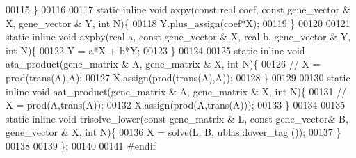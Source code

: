 \begin{DoxyCode}
00115   \}
00116 
00117   \textcolor{keyword}{static} \textcolor{keyword}{inline} \textcolor{keywordtype}{void} axpy(\textcolor{keyword}{const} real coef, \textcolor{keyword}{const} gene\_vector & X, gene\_vector & Y, \textcolor{keywordtype}{int} N)\{
00118     Y.plus\_assign(coef*X);
00119   \}
00120 
00121   \textcolor{keyword}{static} \textcolor{keyword}{inline} \textcolor{keywordtype}{void} axpby(real a, \textcolor{keyword}{const} gene\_vector & X, real b, gene\_vector & Y, \textcolor{keywordtype}{int} N)\{
00122     Y = a*X + b*Y;
00123   \}
00124 
00125   \textcolor{keyword}{static} \textcolor{keyword}{inline} \textcolor{keywordtype}{void} ata\_product(gene\_matrix & A, gene\_matrix & X, \textcolor{keywordtype}{int} N)\{
00126     \textcolor{comment}{// X =  prod(trans(A),A);}
00127     X.assign(prod(trans(A),A));
00128   \}
00129 
00130   \textcolor{keyword}{static} \textcolor{keyword}{inline} \textcolor{keywordtype}{void} aat\_product(gene\_matrix & A, gene\_matrix & X, \textcolor{keywordtype}{int} N)\{
00131     \textcolor{comment}{// X =  prod(A,trans(A));}
00132     X.assign(prod(A,trans(A)));
00133   \}
00134 
00135   \textcolor{keyword}{static} \textcolor{keyword}{inline} \textcolor{keywordtype}{void} trisolve\_lower(\textcolor{keyword}{const} gene\_matrix & L, \textcolor{keyword}{const} gene\_vector& B, gene\_vector & X, \textcolor{keywordtype}{int} N)\{
00136     X = solve(L, B, ublas::lower\_tag ());
00137   \}
00138 
00139 \};
00140 
00141 \textcolor{preprocessor}{#endif}
\end{DoxyCode}
